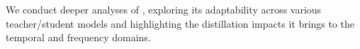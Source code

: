 \begin{compactenum}[(a)]
\item We conduct deeper analyses of \method{}, exploring its adaptability across various teacher/student models and highlighting the distillation impacts it brings to the temporal and frequency domains.







\end{compactenum}





